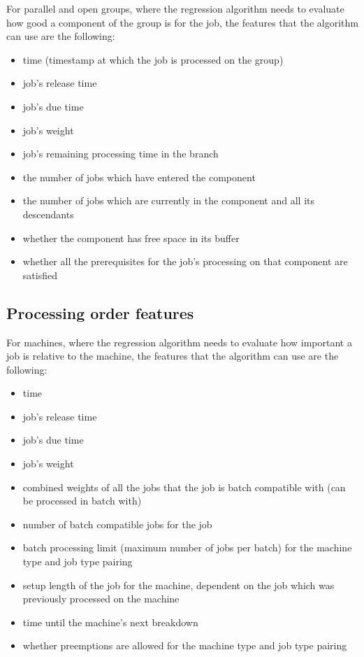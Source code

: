 For parallel and open groups, where the regression algorithm needs to evaluate how good a component of the group is for the job, the features that the algorithm can use are the following:
\begin{itemize}
    \item time (timestamp at which the job is processed on the group)
    \item job's release time
    \item job's due time
    \item job's weight
    \item job's remaining processing time in the branch
    \item the number of jobs which have entered the component
    \item the number of jobs which are currently in the component and all its descendants
    \item whether the component has free space in its buffer
    \item whether all the prerequisites for the job's processing on that component are satisfied
  \end{itemize}

\subsection{Processing order features}

For machines, where the regression algorithm needs to evaluate how important a job is relative to the machine, the features that the algorithm can use are the following:
\begin{itemize}
	\item time
	\item job's release time
	\item job's due time
	\item job's weight
	\item combined weights of all the jobs that the job is batch compatible with (can be processed in batch with)
	\item number of batch compatible jobs for the job
	\item batch processing limit (maximum number of jobs per batch) for the machine type and job type pairing
	\item setup length of the job for the machine, dependent on the job which was previously processed on the machine
	\item time until the machine's next breakdown
	\item whether preemptions are allowed for the machine type and job type pairing
\end{itemize}

